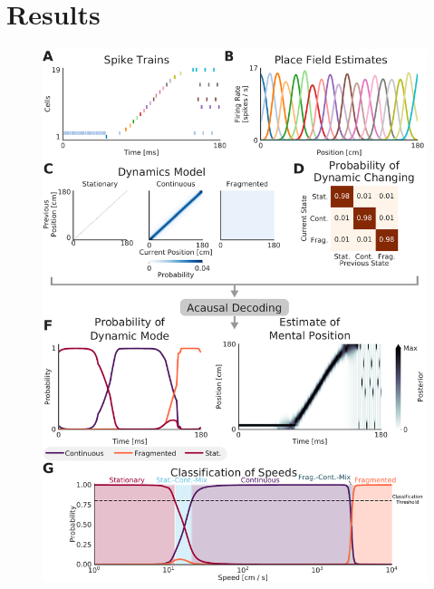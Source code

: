 \documentclass[times, twoside]{zHenriquesLab-StyleBioRxiv}
\begin{document}
\section*{Results}
\begin{figure}%
\centering
\includegraphics[width=0.80\linewidth]{figures/Figure1/Figure1_v4}

\end{figure}
\end{document}
